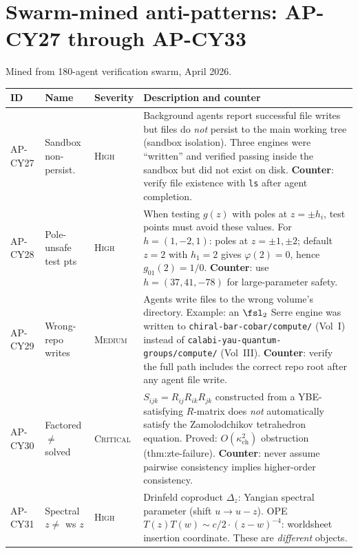 \section{Swarm-mined anti-patterns: AP-CY27 through AP-CY33}
\label{sec:ap-cy27-33-full}

Mined from 180-agent verification swarm, April 2026.

{%
\small
\begin{longtable}{@{}p{1.6cm}p{2.4cm}lp{7.4cm}@{}}
\toprule
\textbf{ID} & \textbf{Name} & \textbf{Severity}
  & \textbf{Description and counter} \\
\midrule
\endhead
AP-CY27 & Sandbox non-persist. & \textsc{High} &
  Background agents report successful file writes but files
  do \emph{not} persist to the main working tree (sandbox
  isolation).  Three engines were ``written'' and verified
  passing inside the sandbox but did not exist on disk.
  \textbf{Counter}: verify file existence with \texttt{ls}
  after agent completion. \\
\midrule
AP-CY28 & Pole-unsafe test pts & \textsc{High} &
  When testing $g(z)$ with poles at $z = \pm h_i$, test
  points must avoid these values.  For $h = (1,-2,1)$:
  poles at $z = \pm 1, \pm 2$; default $z = 2$ with
  $h_1 = 2$ gives $\varphi(2) = 0$, hence
  $g_{01}(2) = 1/0$.
  \textbf{Counter}: use $h = (37, 41, -78)$ for
  large-parameter safety. \\
\midrule
AP-CY29 & Wrong-repo writes & \textsc{Medium} &
  Agents write files to the wrong volume's directory.
  Example: an $\fsl_2$ Serre engine was written to
  \texttt{chiral-bar-cobar/compute/} (Vol~I) instead of
  \texttt{calabi-yau-quantum-groups/compute/} (Vol~III).
  \textbf{Counter}: verify the full path includes the
  correct repo root after any agent file write. \\
\midrule
AP-CY30 & Factored $\neq$ solved & \textsc{Critical} &
  $S_{ijk} = R_{ij} R_{ik} R_{jk}$ constructed from a
  YBE-satisfying $R$-matrix does \emph{not} automatically
  satisfy the Zamolodchikov tetrahedron equation.
  Proved: $O(\kappa_{\mathrm{ch}}^2)$ obstruction
  (thm:zte-failure).
  \textbf{Counter}: never assume pairwise consistency
  implies higher-order consistency. \\
\midrule
AP-CY31 & Spectral $z \neq$ ws $z$ & \textsc{High} &
  Drinfeld coproduct $\Delta_z$: Yangian spectral parameter
  (shift $u \to u - z$).
  OPE $T(z)T(w) \sim c/2 \cdot (z-w)^{-4}$: worldsheet
  insertion coordinate.  These are \emph{different} objects.

\end{longtable}}
